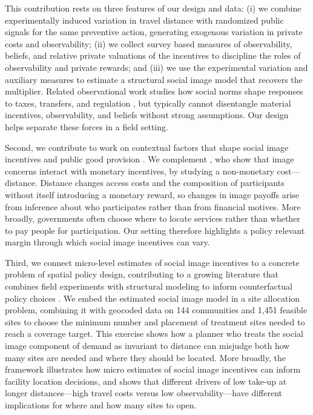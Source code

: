 \documentclass[12pt,a4paper]{article}
\begin{document}
This contribution rests on three features of our design and data: (i) we combine experimentally induced variation in travel distance with randomized public signals for the same preventive action, generating exogenous variation in private costs and observability; (ii) we collect survey based measures of observability, beliefs, and relative private valuations of the incentives to discipline the roles of observability and private rewards; and (iii) we use the experimental variation and auxiliary measures to estimate a structural social image model that recovers the multiplier. Related observational work studies how social norms shape responses to taxes, transfers, and regulation \citep{jia2019individual,besley2023norms,bobonis2025norms}, but typically cannot disentangle material incentives, observability, and beliefs without strong assumptions. Our design helps separate these forces in a field setting.

Second, we contribute to work on contextual factors that shape social image incentives and public good provision \citep{kessler_announcements_2017,perez-truglia_partisan_2017,karing}. We complement \citet{ariely2009}, who show that image concerns interact with monetary incentives, by studying a non-monetary cost---distance. Distance changes access costs and the composition of participants without itself introducing a monetary reward, so changes in image payoffs arise from inference about who participates rather than from financial motives. More broadly, governments often choose where to locate services rather than whether to pay people for participation. Our setting therefore highlights a policy relevant margin through which social image incentives can vary.

Third, we connect micro-level estimates of social image incentives to a concrete problem of spatial policy design, contributing to a growing literature that combines field experiments with structural modeling to inform counterfactual policy choices \citep{ToddWolpin,KaboskiTownsend,DufloHannaRyan,LagakosMobarakWaugh}. We embed the estimated social image model in a site allocation problem, combining it with geocoded data on 144 communities and 1{,}451 feasible sites to choose the minimum number and placement of treatment sites needed to reach a coverage target. This exercise shows how a planner who treats the social image component of demand as invariant to distance can misjudge both how many sites are needed and where they should be located. More broadly, the framework illustrates how micro estimates of social image incentives can inform facility location decisions, and shows that different drivers of low take-up at longer distances---high travel costs versus low observability---have different implications for where and how many sites to open.
\end{document}
